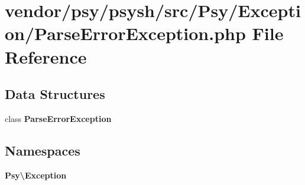 \section{vendor/psy/psysh/src/\+Psy/\+Exception/\+Parse\+Error\+Exception.php File Reference}
\label{_parse_error_exception_8php}
\subsection*{Data Structures}
\begin{DoxyCompactItemize}
\item 
class {\bf Parse\+Error\+Exception}
\end{DoxyCompactItemize}
\subsection*{Namespaces}
\begin{DoxyCompactItemize}
\item 
 {\bf Psy\textbackslash{}\+Exception}
\end{DoxyCompactItemize}
